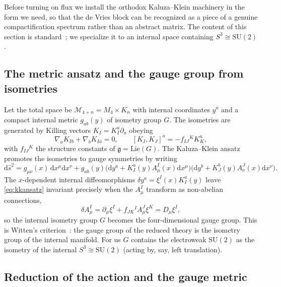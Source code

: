 \documentclass[11pt]{article}
\theoremstyle{plain}
\theoremstyle{definition}
\newcommand{\cM}{\mathcal{M}}
\newcommand{\dd}{\mathrm{d}}
\newcommand{\SU}{\mathrm{SU}}
\begin{document}
Before turning on flux we install the orthodox Kaluza--Klein machinery in the
form we need, so that the de Vries block can be recognized as a piece of a
genuine compactification spectrum rather than an abstract matrix. The content
of this section is standard~\cite{Witten1981,SalamStrathdee,DuffNilssonPope1986,Weinberg1983};
we specialize it to an internal space containing $S^3\cong\SU(2)$.

\subsection{The metric ansatz and the gauge group from isometries}

Let the total space be $\cM_{4+n}=M_4\times K_n$ with internal coordinates
$y^a$ and a compact internal metric $g_{ab}(y)$ of isometry group $G$. The
isometries are generated by Killing vectors $K_I=K_I^a\partial_a$ obeying
\begin{equation}
\nabla_aK_{Ib}+\nabla_bK_{Ia}=0,
\qquad
[K_I,K_J]^a=-f_{IJ}{}^{K}K_K^a,
\end{equation}
with $f_{IJ}{}^K$ the structure constants of $\mathfrak g=\mathrm{Lie}(G)$.
The Kaluza--Klein ansatz promotes the isometries to gauge symmetries by
writing
\begin{equation}
\dd\hat s^2=g_{\mu\nu}(x)\,\dd x^\mu\dd x^\nu
+g_{ab}(y)\bigl(\dd y^a+K^a_I(y)A^I_\mu(x)\dd x^\mu\bigr)
\bigl(\dd y^b+K^b_J(y)A^J_\nu(x)\dd x^\nu\bigr).
\label{eq:kkansatz}
\end{equation}
The $x$-dependent internal diffeomorphisms $\delta y^a=\xi^I(x)K^a_I(y)$ leave
\eqref{eq:kkansatz} invariant precisely when the $A^I_\mu$ transform as
non-abelian connections,
\begin{equation}
\delta A^I_\mu=\partial_\mu\xi^I+f_{JK}{}^{I}A^J_\mu\xi^K=D_\mu\xi^I,
\end{equation}
so the internal isometry group $G$ becomes the four-dimensional gauge group.
This is Witten's criterion~\cite{Witten1981}: the gauge group of the reduced
theory is the isometry group of the internal manifold. For us $G$ contains the
electroweak $\SU(2)$ as the isometry of the internal $S^3\cong\SU(2)$ (acting
by, say, left translation).

\subsection{Reduction of the action and the gauge metric}
\end{document}
